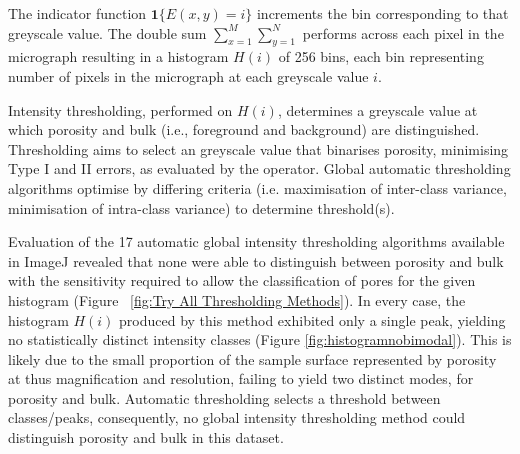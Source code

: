 \documentclass[review]{elsarticle}
\begin{document}
The indicator function \(\mathbf{1}\{E(x,y)=i\}\) increments the bin
corresponding to that greyscale value. The double sum
\(\sum_{x=1}^M\sum_{y=1}^N\) performs  across each pixel in the micrograph
resulting in a histogram \(H(i)\) of 256 bins, each bin representing number of
pixels in the micrograph at each greyscale value \(i\). 

Intensity thresholding, performed on \(H(i)\), determines a greyscale value at
which porosity and bulk (i.e., foreground and background) are distinguished.
Thresholding aims to select an greyscale value that binarises porosity,
minimising Type I and II errors, as evaluated by the operator. Global automatic
thresholding algorithms optimise by differing criteria (i.e. maximisation of
inter-class variance, minimisation of intra-class variance) to determine
threshold(s). 

Evaluation of the 17 automatic global intensity thresholding algorithms
available in ImageJ revealed that none were able to distinguish between porosity
and bulk with the sensitivity required to allow the classification of pores for
the given histogram (Figure ~\ref{fig:Try All Thresholding Methods}). In every
case, the histogram \(H(i)\) produced by this method exhibited only a single
peak, yielding no statistically distinct intensity classes (Figure
\ref{fig:histogramnobimodal}). This is likely due to the small proportion of the
sample surface represented by porosity at thus magnification and resolution,
failing to yield two distinct modes, for porosity and bulk. Automatic
thresholding selects a threshold between classes/peaks, consequently, no global
intensity thresholding method could distinguish porosity and bulk in this
dataset.

\end{document}
